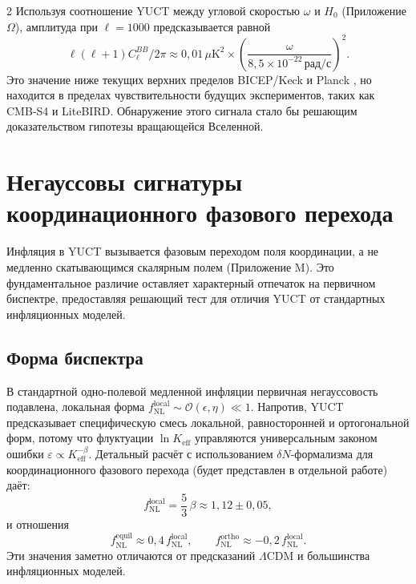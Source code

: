 \documentclass[11pt,a4paper]{article}
\begin{document}
\begin{multicols}{2}
		Используя соотношение YUCT между угловой скоростью $\omega$ и $H_0$ (Приложение $\Omega$), амплитуда при $\ell=1000$ предсказывается равной
		\begin{equation}
			\ell(\ell+1)C_\ell^{BB}/2\pi \approx 0,01\,\mu\text{K}^2 \times \left(\frac{\omega}{8,5\times10^{-22}\,\text{рад/с}}\right)^2.
			\label{eq:BB_amplitude}
		\end{equation}
		Это значение ниже текущих верхних пределов BICEP/Keck и Planck \cite{BICEP2021}, но находится в пределах чувствительности будущих экспериментов, таких как CMB‑S4 и LiteBIRD. Обнаружение этого сигнала стало бы решающим доказательством гипотезы вращающейся Вселенной.
		
		\section{Негауссовы сигнатуры координационного фазового перехода}
		\label{sec:nongaussian}
		
		Инфляция в YUCT вызывается фазовым переходом поля координации, а не медленно скатывающимся скалярным полем (Приложение M). Это фундаментальное различие оставляет характерный отпечаток на первичном биспектре, предоставляя решающий тест для отличия YUCT от стандартных инфляционных моделей.
		
		\subsection{Форма биспектра}
		В стандартной одно-полевой медленной инфляции первичная негауссовость подавлена, локальная форма $f_{\mathrm{NL}}^{\mathrm{local}} \sim \mathcal{O}(\epsilon,\eta) \ll 1$. Напротив, YUCT предсказывает специфическую смесь локальной, равносторонней и ортогональной форм, потому что флуктуации $\ln K_{\mathrm{eff}}$ управляются универсальным законом ошибки $\varepsilon \propto K_{\mathrm{eff}}^{-\beta}$. Детальный расчёт с использованием $\delta N$-формализма для координационного фазового перехода (будет представлен в отдельной работе) даёт:
		\begin{equation}
			f_{\mathrm{NL}}^{\mathrm{local}} = \frac{5}{3}\,\beta \approx 1,12 \pm 0,05,
		\end{equation}
		и отношения
		\begin{equation}
			f_{\mathrm{NL}}^{\mathrm{equil}} \approx 0,4\, f_{\mathrm{NL}}^{\mathrm{local}}, \qquad
			f_{\mathrm{NL}}^{\mathrm{ortho}} \approx -0,2\, f_{\mathrm{NL}}^{\mathrm{local}}.
		\end{equation}
		Эти значения заметно отличаются от предсказаний $\Lambda$CDM и большинства инфляционных моделей.
		

\end{multicols}
\end{document}
